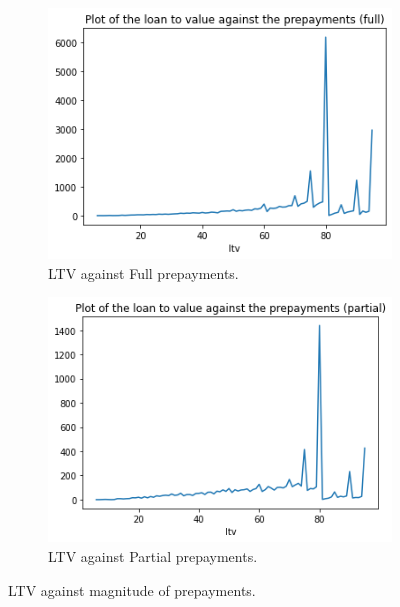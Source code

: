         \begin{figure}[H]
            \centering
            \begin{subfigure}{0.45\textwidth}
                \includegraphics[width=\linewidth]{Figures/LTV againts Full prepayments.png}
                \caption{
                    LTV against Full prepayments.
                    }
                \label{model_LTV_against_full_prepayment}
            \end{subfigure}
            \begin{subfigure}{0.45\textwidth}
                \includegraphics[width=\linewidth]{Figures/LTV againts Partial prepayments.png}
                \caption{
                    LTV against Partial prepayments.
                    }
                \label{model_LTV_against_partial_prepayment}
            \end{subfigure}
            \caption{LTV against magnitude of prepayments.}
            \label{model_LTV_against_prepayment}
        \end{figure}
    
